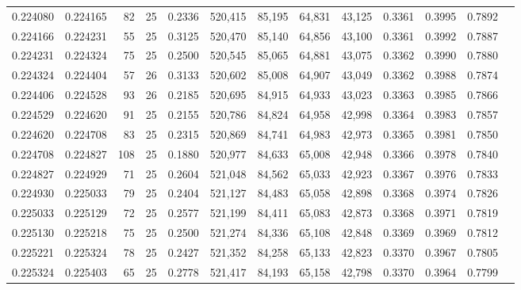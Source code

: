 \begin{tabular}{rrrrrrrrrrrrr}
0.224080 & 0.224165 &    82 &  25 &                                     0.2336 & 520,415 &  85,195 &  64,831 &  43,125 & 0.3361 & 0.3995 & 0.7892 \\
0.224166 & 0.224231 &    55 &  25 &                                     0.3125 & 520,470 &  85,140 &  64,856 &  43,100 & 0.3361 & 0.3992 & 0.7887 \\
0.224231 & 0.224324 &    75 &  25 &                                     0.2500 & 520,545 &  85,065 &  64,881 &  43,075 & 0.3362 & 0.3990 & 0.7880 \\
0.224324 & 0.224404 &    57 &  26 &                                     0.3133 & 520,602 &  85,008 &  64,907 &  43,049 & 0.3362 & 0.3988 & 0.7874 \\
0.224406 & 0.224528 &    93 &  26 &                                     0.2185 & 520,695 &  84,915 &  64,933 &  43,023 & 0.3363 & 0.3985 & 0.7866 \\
0.224529 & 0.224620 &    91 &  25 &                                     0.2155 & 520,786 &  84,824 &  64,958 &  42,998 & 0.3364 & 0.3983 & 0.7857 \\
0.224620 & 0.224708 &    83 &  25 &                                     0.2315 & 520,869 &  84,741 &  64,983 &  42,973 & 0.3365 & 0.3981 & 0.7850 \\
0.224708 & 0.224827 &   108 &  25 &                                     0.1880 & 520,977 &  84,633 &  65,008 &  42,948 & 0.3366 & 0.3978 & 0.7840 \\
0.224827 & 0.224929 &    71 &  25 &                                     0.2604 & 521,048 &  84,562 &  65,033 &  42,923 & 0.3367 & 0.3976 & 0.7833 \\
0.224930 & 0.225033 &    79 &  25 &                                     0.2404 & 521,127 &  84,483 &  65,058 &  42,898 & 0.3368 & 0.3974 & 0.7826 \\
0.225033 & 0.225129 &    72 &  25 &                                     0.2577 & 521,199 &  84,411 &  65,083 &  42,873 & 0.3368 & 0.3971 & 0.7819 \\
0.225130 & 0.225218 &    75 &  25 &                                     0.2500 & 521,274 &  84,336 &  65,108 &  42,848 & 0.3369 & 0.3969 & 0.7812 \\
0.225221 & 0.225324 &    78 &  25 &                                     0.2427 & 521,352 &  84,258 &  65,133 &  42,823 & 0.3370 & 0.3967 & 0.7805 \\
0.225324 & 0.225403 &    65 &  25 &                                     0.2778 & 521,417 &  84,193 &  65,158 &  42,798 & 0.3370 & 0.3964 & 0.7799 \\

\end{tabular}
